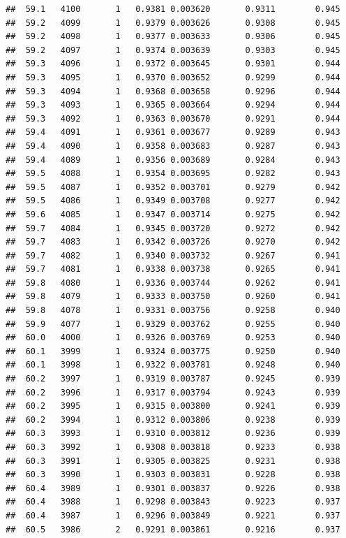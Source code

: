 \documentclass[
]{book}
\begin{document}
\begin{verbatim}
##  59.1   4100       1   0.9381 0.003620       0.9311        0.945
##  59.2   4099       1   0.9379 0.003626       0.9308        0.945
##  59.2   4098       1   0.9377 0.003633       0.9306        0.945
##  59.2   4097       1   0.9374 0.003639       0.9303        0.945
##  59.3   4096       1   0.9372 0.003645       0.9301        0.944
##  59.3   4095       1   0.9370 0.003652       0.9299        0.944
##  59.3   4094       1   0.9368 0.003658       0.9296        0.944
##  59.3   4093       1   0.9365 0.003664       0.9294        0.944
##  59.3   4092       1   0.9363 0.003670       0.9291        0.944
##  59.4   4091       1   0.9361 0.003677       0.9289        0.943
##  59.4   4090       1   0.9358 0.003683       0.9287        0.943
##  59.4   4089       1   0.9356 0.003689       0.9284        0.943
##  59.5   4088       1   0.9354 0.003695       0.9282        0.943
##  59.5   4087       1   0.9352 0.003701       0.9279        0.942
##  59.5   4086       1   0.9349 0.003708       0.9277        0.942
##  59.6   4085       1   0.9347 0.003714       0.9275        0.942
##  59.7   4084       1   0.9345 0.003720       0.9272        0.942
##  59.7   4083       1   0.9342 0.003726       0.9270        0.942
##  59.7   4082       1   0.9340 0.003732       0.9267        0.941
##  59.7   4081       1   0.9338 0.003738       0.9265        0.941
##  59.8   4080       1   0.9336 0.003744       0.9262        0.941
##  59.8   4079       1   0.9333 0.003750       0.9260        0.941
##  59.8   4078       1   0.9331 0.003756       0.9258        0.940
##  59.9   4077       1   0.9329 0.003762       0.9255        0.940
##  60.0   4000       1   0.9326 0.003769       0.9253        0.940
##  60.1   3999       1   0.9324 0.003775       0.9250        0.940
##  60.1   3998       1   0.9322 0.003781       0.9248        0.940
##  60.2   3997       1   0.9319 0.003787       0.9245        0.939
##  60.2   3996       1   0.9317 0.003794       0.9243        0.939
##  60.2   3995       1   0.9315 0.003800       0.9241        0.939
##  60.2   3994       1   0.9312 0.003806       0.9238        0.939
##  60.3   3993       1   0.9310 0.003812       0.9236        0.939
##  60.3   3992       1   0.9308 0.003818       0.9233        0.938
##  60.3   3991       1   0.9305 0.003825       0.9231        0.938
##  60.3   3990       1   0.9303 0.003831       0.9228        0.938
##  60.4   3989       1   0.9301 0.003837       0.9226        0.938
##  60.4   3988       1   0.9298 0.003843       0.9223        0.937
##  60.4   3987       1   0.9296 0.003849       0.9221        0.937
##  60.5   3986       2   0.9291 0.003861       0.9216        0.937

\end{verbatim}
\end{document}
